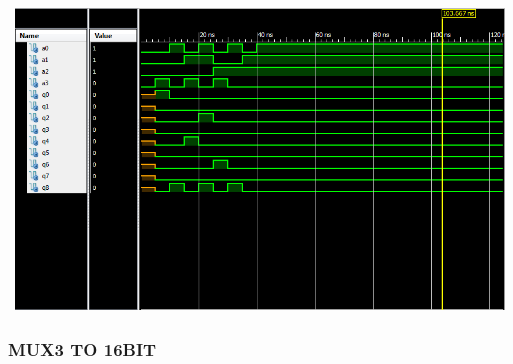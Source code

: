 \documentclass{article}
\begin{document}
\includegraphics[width=16cm, height=8cm]{test_decoder.png}

\pagebreak

\subsubsection{MUX3 TO 16BIT}\label{sec:result}
\end{document}
